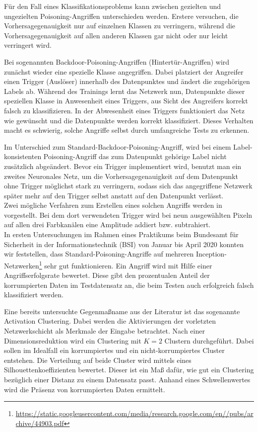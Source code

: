 \documentclass{article}
\theoremstyle{break}
\begin{document}
\noindent Für den Fall eines Klassifikationsproblems kann zwischen gezielten und ungezielten Poisoning-Angriffen unterschieden werden. Erstere versuchen, die Vorhersagegenauigkeit nur auf einzelnen Klassen zu verringern, während die Vorhersagegenauigkeit auf allen anderen Klassen gar nicht oder nur leicht verringert wird.

\noindent Bei sogenannten Backdoor-Poisoning-Angriffen (Hintertür-Angriffen) wird zunächst wieder eine spezielle Klasse angegriffen. Dabei platziert der Angreifer einen Trigger (Auslöser) innerhalb des Datenpunktes und ändert die zugehörigen Labels ab. Während des Trainings lernt das Netzwerk nun, Datenpunkte dieser speziellen Klasse in Anwesenheit eines Triggers, aus Sicht des Angreifers korrekt falsch zu klassifizieren. In der Abwesenheit eines Triggers funktioniert das Netz wie gewünscht und die Datenpunkte werden korrekt klassifiziert. Dieses Verhalten macht es schwierig, solche Angriffe selbst durch umfangreiche Tests zu erkennen.

\noindent Im Unterschied zum Standard-Backdoor-Poisoning-Angriff, wird bei einem Label-konsistenten Poisoning-Angriff das zum Datenpunkt gehörige Label nicht zusätzlich abgeändert. Bevor ein Trigger implementiert wird, benutzt man ein zweites Neuronales Netz, um die Vorhersagegenauigkeit auf dem Datenpunkt ohne Trigger möglichst stark zu verringern, sodass sich das angegriffene Netzwerk später mehr auf den Trigger selbst anstatt auf den Datenpunkt verlässt.\\
Zwei mögliche Verfahren zum Erstellen eines solchen Angriffs werden in \cite{labelconsistent} vorgestellt.
Bei dem dort verwendeten Trigger wird bei neun ausgewählten Pixeln auf allen drei Farbkanälen eine Amplitude addiert bzw. subtrahiert. \\

\noindent In ersten Untersuchungen im Rahmen eines Praktikums beim Bundesamt für Sicherheit in der Informationstechnik (BSI) von Januar bis April 2020  konnten wir feststellen, dass Standard-Poisoning-Angriffe auf mehreren Inception-Netzwerken\footnote{ \url{https://static.googleusercontent.com/media/research.google.com/en//pubs/archive/44903.pdf}} sehr gut funktionieren. Ein Angriff wird mit Hilfe einer Angriffserfolgsrate bewertet. Diese gibt den prozentualen Anteil der korrumpierten Daten im Testdatensatz an, die beim Testen auch erfolgreich falsch klassifiziert werden.

\noindent Eine bereits untersuchte Gegenmaßname aus der Literatur ist das sogenannte Activation Clustering\cite{AC}. Dabei werden die Aktivierungen der vorletzten Netzwerkschicht als Merkmale der Eingabe betrachtet. Nach einer Dimensionsreduktion wird ein Clustering mit $K=2$ Clustern durchgeführt. Dabei sollen im Idealfall ein korrumpiertes und ein nicht-korrumpiertes Cluster entstehen. Die Verteilung auf beide Cluster wird mittels eines Silhouettenkoeffizienten bewertet. Dieser ist ein Maß dafür, wie gut ein Clustering bezüglich einer Distanz zu einem Datensatz passt. Anhand eines Schwellenwertes wird die Präsenz von korrumpierten Daten ermittelt.
\end{document}
